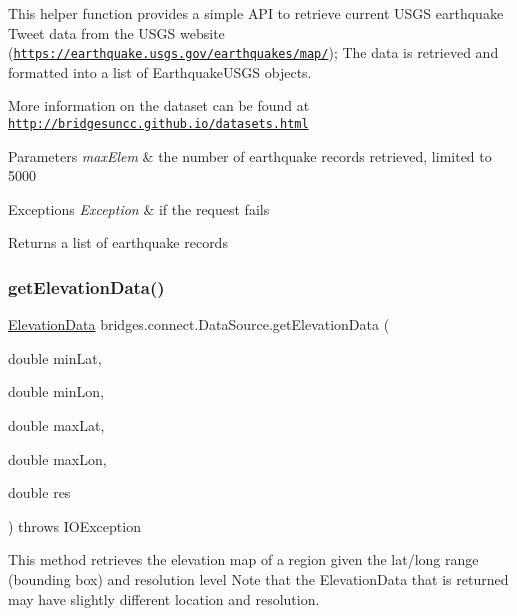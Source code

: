 This helper function provides a simple A\+PI to retrieve current U\+S\+GS earthquake Tweet data from the U\+S\+GS website (\href{https://earthquake.usgs.gov/earthquakes/map/}{\tt https\+://earthquake.\+usgs.\+gov/earthquakes/map/}); The data is retrieved and formatted into a list of Earthquake\+U\+S\+GS objects.

More information on the dataset can be found at \href{http://bridgesuncc.github.io/datasets.html}{\tt http\+://bridgesuncc.\+github.\+io/datasets.\+html}


\begin{DoxyParams}{Parameters}
{\em max\+Elem} & the number of earthquake records retrieved, limited to 5000 \\
\hline
\end{DoxyParams}

\begin{DoxyExceptions}{Exceptions}
{\em Exception} & if the request fails\\
\hline
\end{DoxyExceptions}
\begin{DoxyReturn}{Returns}
a list of earthquake records 
\end{DoxyReturn}
\mbox{\label{classbridges_1_1connect_1_1_data_source_ac3aec28786d148e6b3554c78679bb4c2}} 
\subsubsection{\texorpdfstring{get\+Elevation\+Data()}{getElevationData()}}
{\footnotesize\ttfamily \hyperlink{classbridges_1_1data__src__dependent_1_1_elevation_data}{Elevation\+Data} bridges.\+connect.\+Data\+Source.\+get\+Elevation\+Data (\begin{DoxyParamCaption}\item[{double}]{min\+Lat,  }\item[{double}]{min\+Lon,  }\item[{double}]{max\+Lat,  }\item[{double}]{max\+Lon,  }\item[{double}]{res }\end{DoxyParamCaption}) throws I\+O\+Exception}

This method retrieves the elevation map of a region given the lat/long range (bounding box) and resolution level Note that the Elevation\+Data that is returned may have slightly different location and resolution.


